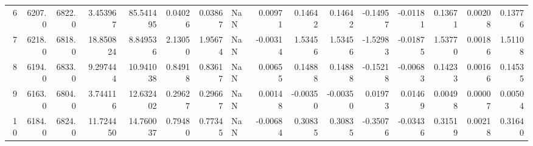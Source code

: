 \begin{longtable}{rrrrrrrlrrrrrrrr}
           6 &          6207.0 &          6822.0 &            3.453967 &             85.541495 &                    0.04026 &                           0.03867 &                                        NaN &                                        0.00971 &                                            0.14642 &                                            0.14642 &                                          -0.14957 &                                           -0.01181 &                 0.13671 &                0.00208 &                   0.13776 \\
           7 &          6218.0 &          6818.0 &           18.850824 &              8.849536 &                    2.13050 &                           1.95674 &                                        NaN &                                       -0.00314 &                                            1.53456 &                                            1.53456 &                                          -1.52983 &                                           -0.01875 &                 1.53770 &                0.00186 &                   1.51108 \\
           8 &          6194.0 &          6833.0 &            9.297444 &             10.941038 &                    0.84918 &                           0.83617 &                                        NaN &                                        0.00655 &                                            0.14888 &                                            0.14888 &                                          -0.15218 &                                           -0.00683 &                 0.14233 &                0.00166 &                   0.14535 \\
           9 &          6163.0 &          6804.0 &            3.744116 &             12.632402 &                    0.29627 &                           0.29667 &                                        NaN &                                        0.00148 &                                           -0.00350 &                                           -0.00350 &                                           0.01973 &                                            0.01469 &                 0.00498 &                0.00007 &                   0.00504 \\
          10 &          6184.0 &          6824.0 &           11.724450 &             14.760037 &                    0.79480 &                           0.77345 &                                        NaN &                                       -0.00684 &                                            0.30835 &                                            0.30835 &                                          -0.35076 &                                           -0.03436 &                 0.31519 &                0.00218 &                   0.31640 \\
\end{longtable}
